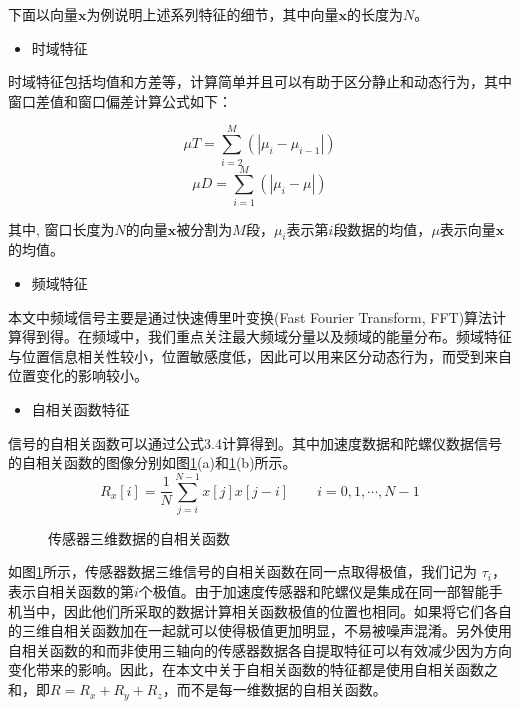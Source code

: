 下面以向量$\textbf{x}$为例说明上述系列特征的细节，其中向量$\textbf{x}$的长度为$N$。
\begin{itemize}
	\item 时域特征
\end{itemize}
\par 时域特征包括均值和方差等，计算简单并且可以有助于区分静止和动态行为，其中窗口差值和窗口偏差计算公式如下：

\begin{equation}
	\mu T = \sum_{i=2}^{M}(|\mu_i - \mu_{i-1}|)
\end{equation}
\begin{equation}
	\mu D = \sum_{i=1}^{M}(|\mu_i - \mu|)
\end{equation}

其中, 窗口长度为$N$的向量$\textbf{x}$被分割为$M$段，$\mu_i$表示第$i$段数据的均值，$\mu$表示向量$\textbf{x}$的均值。

\begin{itemize}
	\item 频域特征
\end{itemize}

\par 本文中频域信号主要是通过快速傅里叶变换(Fast Fourier Transform, FFT)算法计算得到得。在频域中，我们重点关注最大频域分量以及频域的能量分布。频域特征与位置信息相关性较小，位置敏感度低，因此可以用来区分动态行为，而受到来自位置变化的影响较小。
\begin{itemize}
	\item 自相关函数特征
\end{itemize}
\par 信号的自相关函数可以通过公式3.4计算得到。其中加速度数据和陀螺仪数据信号的自相关函数的图像分别如图\ref{three_dimen}(a)和\ref{three_dimen}(b)所示。
\begin{equation}
	R_x[i]=\frac{1}{N}\sum_{j=i}^{N-1} x[j]x[j-i]\qquad  i=0, 1, \cdots, N-1
\end{equation}
\begin{figure}[!htb]
    \centering
    \caption{传感器三维数据的自相关函数} \label{three_dimen}
\end{figure}

\par 如图\ref{three_dimen}所示，传感器数据三维信号的自相关函数在同一点取得极值，我们记为 $\tau_i$，表示自相关函数的第$i$个极值。由于加速度传感器和陀螺仪是集成在同一部智能手机当中，因此他们所采取的数据计算相关函数极值的位置也相同。如果将它们各自的三维自相关函数加在一起就可以使得极值更加明显，不易被噪声混淆。另外使用自相关函数的和而非使用三轴向的传感器数据各自提取特征可以有效减少因为方向变化带来的影响。因此，在本文中关于自相关函数的特征都是使用自相关函数之和，即$R = R_x + R_y + R_z$，而不是每一维数据的自相关函数。

